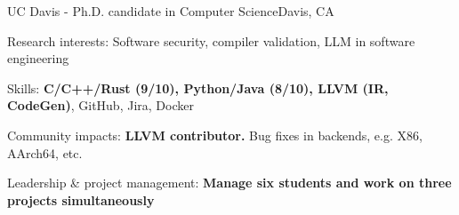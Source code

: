 \renewcommand{\timeInterval}{\DTMdisplaydate{2019}{9}{27}{-1} - }

\ifx\lang\eng
	\begin{rSubsection}{UC Davis}{\timeInterval}{Ph.D. candidate in Computer Science}{Davis, CA}
		\item Research interests: Software security, compiler validation, LLM in software engineering
		\item Skills: \textbf{C/C++/Rust (9/10), Python/Java (8/10), LLVM (IR, CodeGen)}, GitHub, Jira, Docker
		\item Community impacts: \textbf{LLVM contributor.} Bug fixes in backends, e.g. X86, AArch64, etc.
		\item Leadership \& project management: \textbf{Manage six students and work on three projects simultaneously}
	\end{rSubsection}
	\vspace{-0.1em}
\else
\fi

\renewcommand{\timeInterval}{}